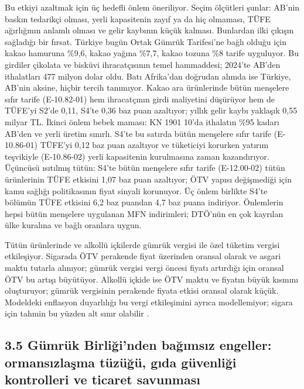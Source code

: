 Bu etkiyi azaltmak için üç hedefli önlem öneriliyor. Seçim ölçütleri şunlar: AB'nin baskın tedarikçi olması, yerli kapasitenin zayıf ya da hiç olmaması, TÜFE ağırlığının anlamlı olması ve gelir kaybının küçük kalması. Bunlardan ilki çıkışın sağladığı bir fırsat. Türkiye bugün Ortak Gümrük Tarifesi'ne bağlı olduğu için kakao hamuruna \%9,6, kakao yağına \%7,7, kakao tozuna \%8 tarife uyguluyor. Bu girdiler çikolata ve bisküvi ihracatçısının temel hammaddesi; 2024'te AB'den ithalatları 477 milyon dolar oldu. Batı Afrika'dan doğrudan alımda ise Türkiye, AB'nin aksine, hiçbir tercih tanımıyor. Kakao ara ürünlerinde bütün menşelere sıfır tarife (E-10.82-01) hem ihracatçının girdi maliyetini düşürüyor hem de TÜFE'yi S2'de 0,11, S4'te 0,36 baz puan azaltıyor; yıllık gelir kaybı yaklaşık 0,55 milyar TL. İkinci önlem bebek maması: KN 1901 10'da ithalatın \%95 kadarı AB'den ve yerli üretim sınırlı. S4'te bu satırda bütün menşelere sıfır tarife (E-10.86-01) TÜFE'yi 0,12 baz puan azaltıyor ve tüketiciyi korurken yatırım teşvikiyle (E-10.86-02) yerli kapasitenin kurulmasına zaman kazandırıyor. Üçüncüsü ısıtılmış tütün: S4'te bütün menşelere sıfır tarife (E-12.00-02) tütün ürünlerinin TÜFE etkisini 1,07 baz puan azaltıyor; ÖTV yapısı değişmediği için kamu sağlığı politikasının fiyat sinyali korunuyor. Üç önlem birlikte S4'te bölümün TÜFE etkisini 6,2 baz puandan 4,7 baz puana indiriyor. Önlemlerin hepsi bütün menşelere uygulanan MFN indirimleri; DTÖ'nün en çok kayrılan ülke kuralına ve bağlı oranlara uygun.

Tütün ürünlerinde ve alkollü içkilerde gümrük vergisi ile özel tüketim vergisi etkileşiyor. Sigarada ÖTV perakende fiyat üzerinden oransal olarak ve asgari maktu tutarla alınıyor; gümrük vergisi vergi öncesi fiyatı artırdığı için oransal ÖTV bu artışı büyütüyor. Alkollü içkide ise ÖTV maktu ve fiyatın büyük kısmını oluşturuyor; gümrük vergisinin perakende fiyata etkisi oransal olarak küçük. Modeldeki enflasyon duyarlılığı bu vergi etkileşimini ayrıca modellemiyor; sigara için tahmin bu yüzden alt sınır olabilir \etiketT{}.

\hypertarget{nace_kartlar_10-12-35-guxfcmruxfck-birliux11finden-baux11fux131msux131z-engeller-ormansux131zlaux15fma-tuxfczuxfcux11fuxfc-gux131da-guxfcvenliux11fi-kontrolleri-ve-ticaret-savunmasux131}{%
\subsection{3.5 Gümrük Birliği'nden bağımsız engeller: ormansızlaşma tüzüğü, gıda güvenliği kontrolleri ve ticaret savunması}\label{nace_kartlar_10-12-35-guxfcmruxfck-birliux11finden-baux11fux131msux131z-engeller-ormansux131zlaux15fma-tuxfczuxfcux11fuxfc-gux131da-guxfcvenliux11fi-kontrolleri-ve-ticaret-savunmasux131}}

